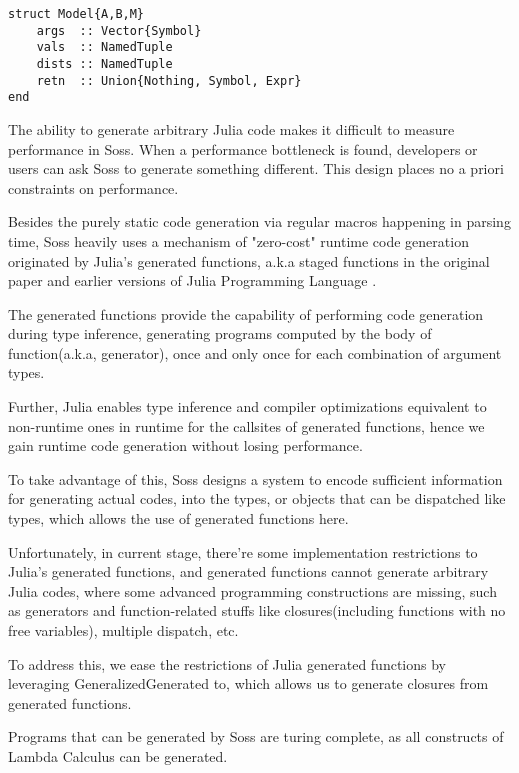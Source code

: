 \documentclass[anonymous=false, %
               format=acmsmall, %
               review=true, %
               screen=true, %
               nonacm=true]{acmart}
\begin{document}
\begin{verbatim}
struct Model{A,B,M} 
    args  :: Vector{Symbol}
    vals  :: NamedTuple
    dists :: NamedTuple
    retn  :: Union{Nothing, Symbol, Expr}
end
\end{verbatim}

The ability to generate arbitrary  Julia code makes it difficult to measure performance in Soss. When a performance bottleneck is found, developers or users can ask Soss to generate something different. This design places no a priori constraints on performance.


Besides the purely static code generation via regular macros happening in parsing time, Soss heavily uses a mechanism of "zero-cost" runtime code generation originated by Julia's generated functions, a.k.a staged functions in the original paper and earlier versions of Julia Programming Language \cite{bezanson2012julia}.

The generated functions provide the capability of performing code generation during type inference, generating programs computed by the body of function(a.k.a, generator), once and only once for each combination of argument types.

Further, Julia enables type inference and compiler optimizations equivalent to non-runtime ones in runtime for the callsites of generated functions, hence we gain runtime code generation without losing performance.

To take advantage of this, Soss designs a system to encode sufficient information for generating actual codes, into the types, or objects that can be dispatched like types, which allows the use of generated functions here.

Unfortunately, in current stage, there're some implementation restrictions to Julia's generated functions, and generated functions cannot generate arbitrary Julia codes,
where some advanced programming constructions are missing, such as generators and function-related stuffs like closures(including functions with no free variables), multiple dispatch, etc.

To address this, we ease the restrictions of Julia generated functions by leveraging GeneralizedGenerated \cite{taine_zhao_2020_3596233} to,
which allows us to generate closures from generated functions.

Programs that can be generated by Soss are turing complete, as all constructs of Lambda Calculus can be generated.
\end{document}
